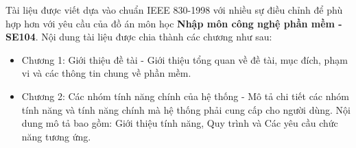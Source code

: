Tài liệu được viết dựa vào chuẩn IEEE 830-1998 \cite{IEEE830} với nhiều sự điều chỉnh để phù hợp hơn với yêu cầu của đồ án môn học \textbf{Nhập môn công nghệ phần mềm - SE104}. Nội dung tài liệu được chia thành các chương như sau:
\begin{itemize}
    \item Chương 1: Giới thiệu đề tài - Giới thiệu tổng quan về đề tài, mục đích, phạm vi và các thông tin chung về phần mềm.
    \item Chương 2: Các nhóm tính năng chính của hệ thống - Mô tả chi tiết các nhóm tính năng và tính năng chính mà hệ thống phải cung cấp cho người dùng. Nội dung mô tả bao gồm: Giới thiệu tính năng, Quy trình và Các yêu cầu chức năng tương ứng.
\end{itemize}